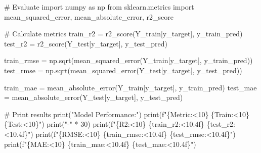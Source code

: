 \documentclass[
  letterpaper,
  DIV=11,
  numbers=noendperiod]{scrartcl}
\newenvironment{Shaded}{\begin{snugshade}}{\end{snugshade}}
\newcommand{\BuiltInTok}[1]{\textcolor[rgb]{0.00,0.23,0.31}{#1}}
\newcommand{\CommentTok}[1]{\textcolor[rgb]{0.37,0.37,0.37}{#1}}
\newcommand{\DecValTok}[1]{\textcolor[rgb]{0.68,0.00,0.00}{#1}}
\newcommand{\ImportTok}[1]{\textcolor[rgb]{0.00,0.46,0.62}{#1}}
\newcommand{\NormalTok}[1]{\textcolor[rgb]{0.00,0.23,0.31}{#1}}
\newcommand{\OperatorTok}[1]{\textcolor[rgb]{0.37,0.37,0.37}{#1}}
\newcommand{\SpecialCharTok}[1]{\textcolor[rgb]{0.37,0.37,0.37}{#1}}
\newcommand{\SpecialStringTok}[1]{\textcolor[rgb]{0.13,0.47,0.30}{#1}}
\newcommand{\StringTok}[1]{\textcolor[rgb]{0.13,0.47,0.30}{#1}}
\begin{document}
\begin{Shaded}
\begin{Highlighting}[]
\CommentTok{\# Evaluate}
\ImportTok{import}\NormalTok{ numpy }\ImportTok{as}\NormalTok{ np}
\ImportTok{from}\NormalTok{ sklearn.metrics }\ImportTok{import}\NormalTok{ mean\_squared\_error, mean\_absolute\_error, r2\_score}

\CommentTok{\# Calculate metrics}
\NormalTok{train\_r2 }\OperatorTok{=}\NormalTok{ r2\_score(Y\_train[y\_target], y\_train\_pred)}
\NormalTok{test\_r2 }\OperatorTok{=}\NormalTok{ r2\_score(Y\_test[y\_target], y\_test\_pred)}

\NormalTok{train\_rmse }\OperatorTok{=}\NormalTok{ np.sqrt(mean\_squared\_error(Y\_train[y\_target], y\_train\_pred))}
\NormalTok{test\_rmse }\OperatorTok{=}\NormalTok{ np.sqrt(mean\_squared\_error(Y\_test[y\_target], y\_test\_pred))}

\NormalTok{train\_mae }\OperatorTok{=}\NormalTok{ mean\_absolute\_error(Y\_train[y\_target], y\_train\_pred)}
\NormalTok{test\_mae }\OperatorTok{=}\NormalTok{ mean\_absolute\_error(Y\_test[y\_target], y\_test\_pred)}

\CommentTok{\# Print results}
\BuiltInTok{print}\NormalTok{(}\StringTok{"Model Performance:"}\NormalTok{)}
\BuiltInTok{print}\NormalTok{(}\SpecialStringTok{f"}\SpecialCharTok{\{}\StringTok{\textquotesingle{}Metric\textquotesingle{}}\SpecialCharTok{:\textless{}10\}}\SpecialStringTok{ }\SpecialCharTok{\{}\StringTok{\textquotesingle{}Train\textquotesingle{}}\SpecialCharTok{:\textless{}10\}}\SpecialStringTok{ }\SpecialCharTok{\{}\StringTok{\textquotesingle{}Test\textquotesingle{}}\SpecialCharTok{:\textless{}10\}}\SpecialStringTok{"}\NormalTok{)}
\BuiltInTok{print}\NormalTok{(}\StringTok{"{-}"} \OperatorTok{*} \DecValTok{30}\NormalTok{)}
\BuiltInTok{print}\NormalTok{(}\SpecialStringTok{f"}\SpecialCharTok{\{}\StringTok{\textquotesingle{}R2\textquotesingle{}}\SpecialCharTok{:\textless{}10\}}\SpecialStringTok{ }\SpecialCharTok{\{}\NormalTok{train\_r2}\SpecialCharTok{:\textless{}10.4f\}}\SpecialStringTok{ }\SpecialCharTok{\{}\NormalTok{test\_r2}\SpecialCharTok{:\textless{}10.4f\}}\SpecialStringTok{"}\NormalTok{)}
\BuiltInTok{print}\NormalTok{(}\SpecialStringTok{f"}\SpecialCharTok{\{}\StringTok{\textquotesingle{}RMSE\textquotesingle{}}\SpecialCharTok{:\textless{}10\}}\SpecialStringTok{ }\SpecialCharTok{\{}\NormalTok{train\_rmse}\SpecialCharTok{:\textless{}10.4f\}}\SpecialStringTok{ }\SpecialCharTok{\{}\NormalTok{test\_rmse}\SpecialCharTok{:\textless{}10.4f\}}\SpecialStringTok{"}\NormalTok{)}
\BuiltInTok{print}\NormalTok{(}\SpecialStringTok{f"}\SpecialCharTok{\{}\StringTok{\textquotesingle{}MAE\textquotesingle{}}\SpecialCharTok{:\textless{}10\}}\SpecialStringTok{ }\SpecialCharTok{\{}\NormalTok{train\_mae}\SpecialCharTok{:\textless{}10.4f\}}\SpecialStringTok{ }\SpecialCharTok{\{}\NormalTok{test\_mae}\SpecialCharTok{:\textless{}10.4f\}}\SpecialStringTok{"}\NormalTok{)}


\end{Highlighting}
\end{Shaded}
\end{document}
